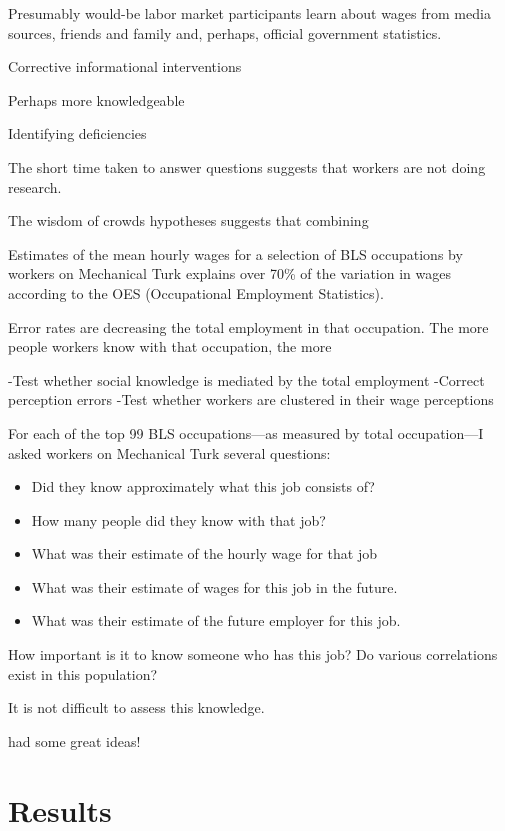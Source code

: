 \documentclass[11pt]{article}
\begin{document}
Presumably would-be labor market participants learn about wages from media sources, friends and family and, perhaps, official government statistics. 

Corrective informational interventions 

Perhaps more knowledgeable 

Identifying deficiencies 

\cite{jensen2010perceived} 

The short time taken to answer questions suggests that workers are not doing research. 

The wisdom of crowds hypotheses suggests that combining 

Estimates of the mean hourly wages for a selection of BLS occupations by workers on Mechanical Turk explains over 70\% of the variation in wages according to the OES (Occupational Employment Statistics).  

Error rates are decreasing the total employment in that occupation. 
The more people workers know with that occupation, the more 

\cite{snowberg2011prediction}
\cite{kohen1975} 
\cite{dupas2009teenagers} 

-Test whether social knowledge is mediated by the total employment 
-Correct perception errors 
-Test whether workers are clustered in their wage perceptions

For each of the top 99 BLS occupations---as measured by total occupation---I asked workers on Mechanical Turk several questions: 
\begin{itemize}
\item Did they know approximately what this job consists of? 
\item How many people did they know with that job? 
\item What was their estimate of the hourly wage for that job 
\item What was their estimate of wages for this job in the future.
\item What was their estimate of the future employer for this job. 
\end{itemize} 


How important is it to know someone who has this job? 
Do various correlations exist in this population? 

It is not difficult to assess this knowledge. 

\cite{smith1999wealth} had some great ideas! 

\section{Results}
\end{document}
